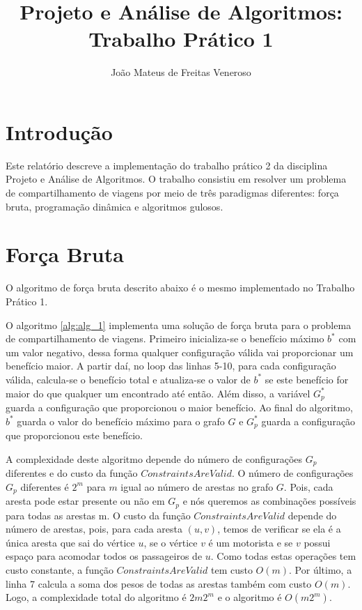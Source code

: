 \documentclass{article}
\begin{document}
\title{Projeto e Análise de Algoritmos: Trabalho Prático 1}
\author{João Mateus de Freitas Veneroso}

\maketitle

\section{Introdução}

Este relatório descreve a implementação do trabalho prático 2 da disciplina Projeto e Análise de Algoritmos. 
O trabalho consistiu em resolver um problema de compartilhamento de viagens por meio de três paradigmas diferentes:
força bruta, programação dinâmica e algoritmos gulosos.

\section{Força Bruta}

O algoritmo de força bruta descrito abaixo é o mesmo implementado no Trabalho Prático 1.

O algoritmo \ref{alg:alg_1} implementa uma solução de força bruta para o problema de compartilhamento de viagens. 
Primeiro inicializa-se o benefício máximo $ b^* $ com um valor negativo, dessa
forma qualquer configuração válida vai proporcionar um benefício maior. A partir daí, no loop das linhas 5-10, para cada configuração
válida, calcula-se o benefício total e atualiza-se o valor de $ b^* $ se este benefício for maior do que qualquer um encontrado até então.
Além disso, a variável $ G_p^* $ guarda a configuração que proporcionou o maior benefício. Ao final do algoritmo, $ b^* $ guarda o valor 
do benefício máximo para o grafo $ G $ e $ G_p^* $ guarda a configuração que proporcionou este benefício. 

A complexidade deste algoritmo depende do número de configurações $ G_p $ diferentes e do custo da função $ ConstraintsAreValid $. O número de 
configurações $ G_p $ diferentes é $ 2^m $ para $ m $ igual ao número de arestas no grafo $ G $. Pois, cada aresta pode estar presente ou
não em $ G_p $ e nós queremos as combinações possíveis para todas as arestas m. O custo da função $ ConstraintsAreValid $ depende do número de 
arestas, pois, para cada aresta $ (u,v) $, temos de verificar se ela é a única aresta que sai do vértice $ u $, se o vértice $ v $ é um motorista
e se $ v $ possui espaço para acomodar todos os passageiros de $ u $. Como todas estas operações tem custo constante, a função $ ConstraintsAreValid $ 
tem custo $ O(m) $. Por último, a linha 7 calcula a soma dos pesos de todas as arestas também com custo $ O(m) $. Logo, 
a complexidade total do algoritmo é $ 2m2^m $ e o algoritmo é $ O(m2^m) $.
\end{document}
